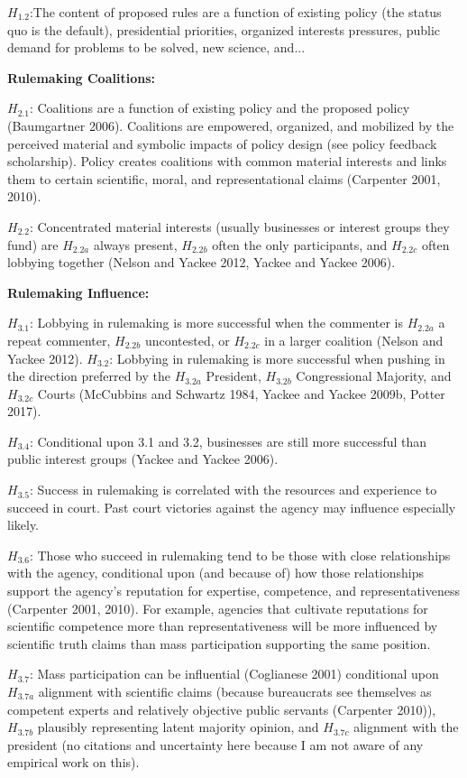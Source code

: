 $H_{1.2}$:The content of proposed rules are a function of existing policy (the status quo is the default), presidential priorities, organized interests pressures, public demand for problems to be solved, new science, and... 


\textbf{Rulemaking Coalitions:}

$H_{2.1}$: Coalitions are a function of existing policy and the proposed policy (Baumgartner 2006). Coalitions are empowered, organized, and mobilized by the perceived material and symbolic impacts of policy design (see policy feedback scholarship). Policy creates coalitions with common material interests and links them to certain scientific, moral, and representational claims (Carpenter 2001, 2010). 

$H_{2.2}$: Concentrated material interests (usually businesses or interest groups they fund) are $H_{2.2a}$ always present, $H_{2.2b}$ often the only participants, and $H_{2.2c}$ often lobbying together (Nelson and Yackee 2012, Yackee and Yackee 2006).

\textbf{Rulemaking Influence:}

$H_{3.1}$: Lobbying in rulemaking is more successful when the commenter is $H_{2.2a}$ a repeat commenter, $H_{2.2b}$ uncontested, or $H_{2.2c}$ in a larger coalition (Nelson and Yackee 2012).
%
$H_{3.2}$: Lobbying in rulemaking is more successful when pushing in the direction preferred by the $H_{3.2a}$ President, $H_{3.2b}$ Congressional Majority, and $H_{3.2c}$ Courts (McCubbins and Schwartz 1984, Yackee and Yackee 2009b, Potter 2017). 

$H_{3.4}$: Conditional upon 3.1 and 3.2, businesses are still more successful than public interest groups (Yackee and Yackee 2006).

$H_{3.5}$: Success in rulemaking is correlated with the resources and experience to succeed in court. Past court victories against the agency may influence especially likely.

$H_{3.6}$: Those who succeed in rulemaking tend to be those with close relationships with the agency, conditional upon (and because of) how those relationships support the agency's reputation for expertise, competence, and representativeness (Carpenter 2001, 2010). For example, agencies that cultivate reputations for scientific competence more than representativeness will be more influenced by scientific truth claims than mass participation supporting the same position.

$H_{3.7}$: Mass participation can be influential (Coglianese 2001) conditional upon $H_{3.7a}$ alignment with scientific claims (because bureaucrats see themselves as competent experts and relatively objective public servants (Carpenter 2010)), $H_{3.7b}$ plausibly representing latent majority opinion, and $H_{3.7c}$ alignment with the president (no citations and uncertainty here because I am not aware of any empirical work on this).

